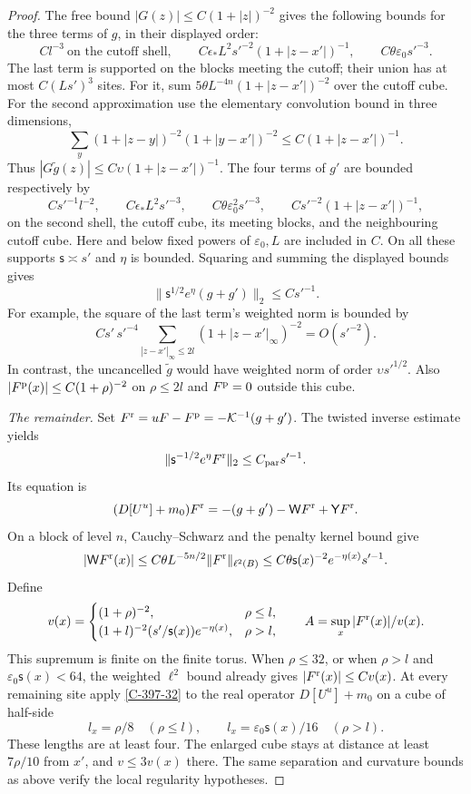 \documentclass[11pt,letterpaper,reqno]{amsart}
\theoremstyle{definition}
\theoremstyle{remark}
\begin{document}
\begin{proof}
The free bound $|G(z)|\le C(1+|z|)^{-2}$ gives the following
bounds for the three terms of $g$, in their displayed order:
\[
 Cl^{-3}\ \text{on the cutoff shell},\qquad
 C\epsilon_*L^2s'^{-2}(1+|z-x'|)^{-1},\qquad
 C\theta\varepsilon_0s'^{-3}.
\]
The last term is supported on the blocks meeting the cutoff;
their union has at most $C(Ls')^3$ sites. For it, sum
$5\theta L^{-4n}(1+|z-x'|)^{-2}$ over the cutoff cube.
For the second approximation use the elementary convolution
bound in three dimensions,
\[
 \sum_y(1+|z-y|)^{-2}(1+|y-x'|)^{-2}
       \le C(1+|z-x'|)^{-1}.
\]
Thus $|G\widetilde g(z)|\le C\upsilon(1+|z-x'|)^{-1}$.
The four terms of $g'$ are bounded respectively by
\[
 Cs'^{-1}l^{-2},\qquad C\epsilon_*L^2s'^{-3},\qquad
 C\theta\varepsilon_0^2s'^{-3},\qquad
 Cs'^{-2}(1+|z-x'|)^{-1},
\]
on the second shell, the cutoff cube, its meeting blocks,
and the neighbouring cutoff cube. Here and below fixed
powers of $\varepsilon_0,L$ are included in $C$.
On all these supports $\mathsf s\asymp s'$ and $\eta$ is
bounded. Squaring and summing the displayed bounds gives
\[
 \|\mathsf s^{1/2}e^\eta(g+g')\|_2\le C s'^{-1}.
\]
For example, the square of the last term's weighted norm is bounded by
\[
 Cs'\,s'^{-4}
 \sum_{|z-x'|_\infty\le2l}(1+|z-x'|_\infty)^{-2}
 =O(s'^{-2}).
\]
In contrast, the uncancelled $\widetilde g$ would have
weighted norm of order $\upsilon s'^{1/2}$.
Also $|F^{\rm p}(x)|\le C(1+\rho)^{-2}$ on $\rho\le2l$
and $F^{\rm p}=0$ outside this cube.

\emph{The remainder.}
Set $F^{\rm r}=uF-F^{\rm p}=-\mathcal K^{-1}(g+g')$.
The twisted inverse estimate yields
\[
 \|\mathsf s^{-1/2}e^\eta F^{\rm r}\|_2
       \le C_{\rm par}s'^{-1}.
\]
Its equation is
\[
 (D[U^u]+m_0)F^{\rm r}
       =-(g+g')-\mathsf WF^{\rm r}+\mathsf YF^{\rm r}.
\]
On a block of level $n$, Cauchy--Schwarz and the penalty
kernel bound give
\[
 |\mathsf WF^{\rm r}(x)|
 \le C\theta L^{-5n/2}\|F^{\rm r}\|_{\ell^2(B)}
 \le C\theta\mathsf s(x)^{-2}e^{-\eta(x)}s'^{-1}.
\]
Define
\[
 v(x)=
 \begin{cases}
 (1+\rho)^{-2},&\rho\le l,\\
 (1+l)^{-2}(s'/\mathsf s(x))e^{-\eta(x)},&\rho>l,
 \end{cases}
 \qquad A=\sup_x|F^{\rm r}(x)|/v(x).
\]
This supremum is finite on the finite torus. When $\rho\le32$,
or when $\rho>l$ and $\varepsilon_0\mathsf s(x)<64$,
the weighted $\ell^2$ bound already gives
$|F^{\rm r}(x)|\le Cv(x)$.
At every remaining site apply \cref{C-397-32} to the real
operator $D[U^u]+m_0$ on a cube of half-side
\[
 l_x=\rho/8\quad(\rho\le l),\qquad
 l_x=\varepsilon_0\mathsf s(x)/16\quad(\rho>l).
\]
These lengths are at least four. The enlarged cube stays at
distance at least $7\rho/10$ from $x'$, and $v\le3v(x)$
there. The same separation and curvature bounds as above
verify the local regularity hypotheses.


\end{proof}
\end{document}
